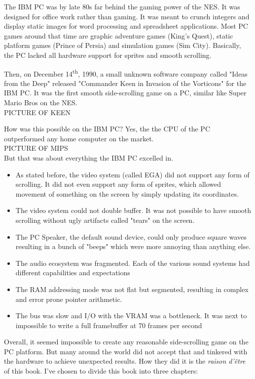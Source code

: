 \documentclass[book.tex]{subfiles}
\begin{document}
\par
The IBM PC was by late 80s far behind the gaming power of the NES. It was designed for office work rather than gaming. It was meant to crunch integers and display static images for word processing and spreadsheet applications. Most PC games around that time are graphic adventure games (King's Quest), static platform games (Prince of Persia) and simulation games (Sim City). Basically, the PC lacked all hardware support for sprites and smooth scrolling.\\
\par
Then, on December 14\textsuperscript{th}, 1990, a small unknown software company called "Ideas from the Deep" released "Commander Keen in Invasion of the Vorticons" for the IBM PC. It was the first smooth side-scrolling game on a PC, similar like Super Mario Bros on the NES. \\
PICTURE OF KEEN\\
\par 
How was this possible on the IBM PC? Yes, the the CPU of the PC outperformed any home computer on the market.\\
PICTURE OF MIPS\\
But that was about everything the IBM PC excelled in.
\begin{itemize}
  \item As stated before, the video system (called EGA) did not support any form of scrolling. It did not even support any form of sprites, which allowed movement of something on the screen by simply updating its  coordinates.
  \item The video system could not double buffer. It was not possible to have smooth scrolling without ugly artifacts called "tears" on the screen.
  \item The PC Speaker, the default sound device, could only produce square waves resulting in a bunch of "beeps" which were more annoying than anything else.
  \item The audio ecosystem was fragmented. Each of the various sound systems had
different capabilities and expectations
  \item The RAM addressing mode was not flat but segmented, resulting in complex and
error prone pointer arithmetic.
  \item The bus was slow and I/O with the VRAM was a bottleneck. It was next to impossible to write a full framebuffer at 70 frames per second
\end{itemize}
Overall, it seemed impossible to create any reasonable side-scrolling game on the PC platform. But many around the world did not accept that and tinkered with the hardware to achieve unexpected results. How they did it is the \textit{raison d'\^etre} of this book. I've chosen to divide this book into three chapters:
\end{document}
